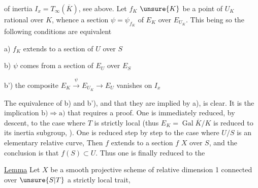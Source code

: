 of inertia $I_x=T_\infty(\overline K)$, see above. Let $f_K$ $\unsure{K}$ be a point of $U_K$ rational over $K$, whence a section $\psi=\psi_{f_K}$ of $E_K$ over $E_{U_K}$. This being so the following conditions are equivalent

\noindent a) $f_K$ extends to a section of $U$ over $S$

\noindent b) $\psi$ comes from a section of $E_U$ over $E_S$

\noindent b') the composite $E_K\xrightarrow{\psi}E_{U_K}\longrightarrow E_U$ vanishes on $I_x$


The equivalence of b) and b'), and that they are implied by a), is clear. It is the implication $\mathrm{b)}\Longrightarrow\mathrm{a)}$ that requires a proof. One is immediately reduced, by descent, to the case  where $T$ is strictly local (thus $E_K=\operatorname{Gal}\overline K/K$ is reduced to its inertia subgroup, ). One is reduced step by step to the case where $U/S$ is an elementary relative curve,   Then $f$ extends to a section $f$  $X$ over $S$, and the conclusion is that $f(S)\subset U$. Thus one is finally reduced to the

\uline{Lemma} Let $X$ be a smooth projective scheme of relative dimension 1 connected over $\unsure{S|T}$ a strictly local trait,
